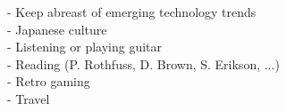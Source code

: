 \divider
{}
\divider
{}
- Keep abreast of emerging technology trends\\
- Japanese culture\\
- Listening or playing guitar\\
- Reading (P. Rothfuss, D. Brown, S. Erikson, ...)\\
- Retro gaming\\
- Travel\\